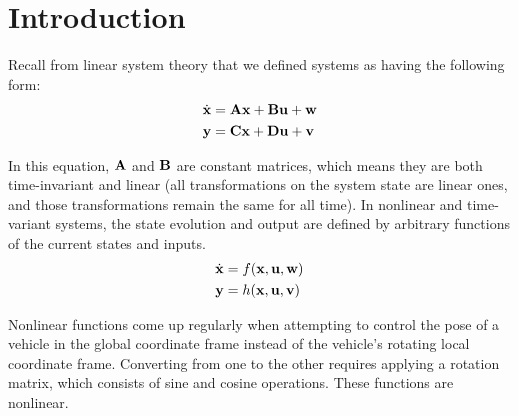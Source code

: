 \section{Introduction}

Recall from linear \gls{system} theory that we defined \glspl{system} as having
the following form:
\begin{align*}
  \dot{\mathbf{x}} &= \mathbf{A}\mathbf{x} + \mathbf{B}\mathbf{u} + \mathbf{w} \\
  \mathbf{y} &= \mathbf{C}\mathbf{x} + \mathbf{D}\mathbf{u} + \mathbf{v}
\end{align*}

In this equation, $\mathbf{A}$ and $\mathbf{B}$ are constant matrices, which means
they are both time-invariant and linear (all transformations on the \gls{system}
\gls{state} are linear ones, and those transformations remain the same for all
time). In nonlinear and time-variant \glspl{system}, the \gls{state} evolution
and \gls{output} are defined by arbitrary functions of the current \glspl{state}
and \glspl{input}.
\begin{align*}
  \dot{\mathbf{x}} &= f(\mathbf{x}, \mathbf{u}, \mathbf{w}) \\
  \mathbf{y} &= h(\mathbf{x}, \mathbf{u}, \mathbf{v})
\end{align*}

Nonlinear functions come up regularly when attempting to control the \gls{pose}
of a vehicle in the global coordinate frame instead of the vehicle's rotating
local coordinate frame. Converting from one to the other requires applying a
rotation matrix, which consists of sine and cosine operations. These functions
are nonlinear.
